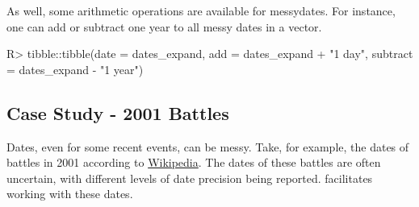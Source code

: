 \documentclass[
]{jss}
\begin{document}
As well, some arithmetic operations are available for messydates. For
instance, one can add or subtract one year to all messy dates in a
vector.

\begin{CodeChunk}
\begin{CodeInput}
R> tibble::tibble(date = dates_expand, add = dates_expand + "1 day", subtract = dates_expand - "1 year")
\end{CodeInput}
\begin{CodeOutput}
# A tibble: 7 x 3
  date                    add                                           subtract
  <mdate>                 <mdate>                                       <mdate> 
1 2001-01-01              2001-01-02                                  ~ 2000-01~
2 2001-01?                2001-01-02..2001-02-01                      ~ 2000-01~
3 2001                    2001-01-02..2002-01-01                      ~ 2000-01~
4 2001-01-01..2001-02-02  2001-01-02..2001-02-03                      ~ 2000-01~
5 {2001-01-01,2001-02-02} {2001-01-02,2001-02-03}                     ~ {2000-0~
6 2001-XX-31              {2001-02-01,2001-03-01,2001-04-01,2001-05-01~ {2000-0~
7 -0021                   -0020-12-31..-0021-12-30                    ~ -0022  ~
\end{CodeOutput}
\end{CodeChunk}

\hypertarget{case-study---2001-battles}{%
\subsection{Case Study - 2001 Battles}\label{case-study---2001-battles}}

Dates, even for some recent events, can be messy. Take, for example, the
dates of battles in 2001 according to
\href{https://en.wikipedia.org/wiki/List_of_battles_in_the_21st_century}{Wikipedia}.
The dates of these battles are often uncertain, with different levels of
date precision being reported.  facilitates working with
these dates.
\end{document}
